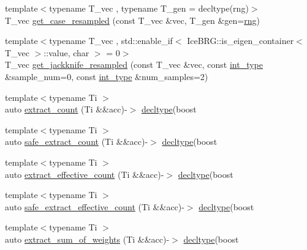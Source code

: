 \begin{DoxyCompactItemize}
\item 
{\footnotesize template$<$typename T\-\_\-vec , typename T\-\_\-gen  = decltype(rng)$>$ }\\T\-\_\-vec \hyperlink{namespaceIceBRG_ae922ec487b3be5021f32c3df392cc8da}{get\-\_\-case\-\_\-resampled} (const T\-\_\-vec \&vec, T\-\_\-gen \&gen=\hyperlink{namespaceIceBRG_a43349d2fe56e49b46f2da45c2472137d}{rng})
\item 
{\footnotesize template$<$typename T\-\_\-vec , std\-::enable\-\_\-if$<$ Ice\-B\-R\-G\-::is\-\_\-eigen\-\_\-container$<$ T\-\_\-vec $>$\-::value, char $>$  = 0$>$ }\\T\-\_\-vec \hyperlink{namespaceIceBRG_afc154bf91798fed11ad39165acd952bb}{get\-\_\-jackknife\-\_\-resampled} (const T\-\_\-vec \&vec, const \hyperlink{lib_2IceBRG__main_2common_8h_ac4de9d9335536ac22821171deec8d39e}{int\-\_\-type} \&sample\-\_\-num=0, const \hyperlink{lib_2IceBRG__main_2common_8h_ac4de9d9335536ac22821171deec8d39e}{int\-\_\-type} \&num\-\_\-samples=2)
\item 
{\footnotesize template$<$typename Ti $>$ }\\auto \hyperlink{namespaceIceBRG_a6e62e94f89c3229eda6e86cca8db6065}{extract\-\_\-count} (Ti \&\&acc)-\/$>$ \hyperlink{namespaceIceBRG_a528e5024ecab03049320529180ae84a8}{decltype}(boost
\item 
{\footnotesize template$<$typename Ti $>$ }\\auto \hyperlink{namespaceIceBRG_a908a29ec3755f42a5562af5c5e466fcc}{safe\-\_\-extract\-\_\-count} (Ti \&\&acc)-\/$>$ \hyperlink{namespaceIceBRG_a528e5024ecab03049320529180ae84a8}{decltype}(boost
\item 
{\footnotesize template$<$typename Ti $>$ }\\auto \hyperlink{namespaceIceBRG_ad44806bece841ba9b3074422a0f7ca7a}{extract\-\_\-effective\-\_\-count} (Ti \&\&acc)-\/$>$ \hyperlink{namespaceIceBRG_a528e5024ecab03049320529180ae84a8}{decltype}(boost
\item 
{\footnotesize template$<$typename Ti $>$ }\\auto \hyperlink{namespaceIceBRG_a8d559a60e692be576adc4d030e1ceea2}{safe\-\_\-extract\-\_\-effective\-\_\-count} (Ti \&\&acc)-\/$>$ \hyperlink{namespaceIceBRG_a528e5024ecab03049320529180ae84a8}{decltype}(boost
\item 
{\footnotesize template$<$typename Ti $>$ }\\auto \hyperlink{namespaceIceBRG_a41a78df2bfb2f703e875c0b9e696c6da}{extract\-\_\-sum\-\_\-of\-\_\-weights} (Ti \&\&acc)-\/$>$ \hyperlink{namespaceIceBRG_a528e5024ecab03049320529180ae84a8}{decltype}(boost

\end{DoxyCompactItemize}
